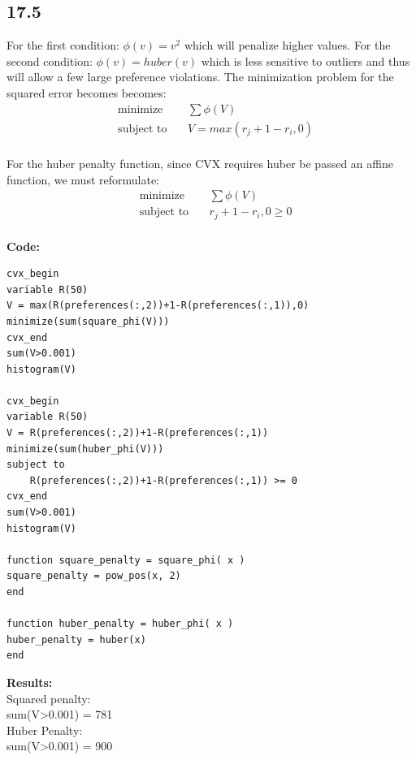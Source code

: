 \documentclass[12pt]{article}
\begin{document}
\subsection*{17.5}
For the first condition: $\phi(v) = v^2$ which will penalize higher values.
For the second condition: $\phi(v) = huber(v)$ which is less sensitive to outliers and thus will allow a few large preference violations.
The minimization problem for the squared error becomes becomes: 
\begin{equation*}
\begin{aligned}
& \underset{}{\text{minimize}}
& & \sum\phi(V)\\
& \text{subject to}\
& & V = max(r_j + 1 - r_i, 0)
\end{aligned}
\end{equation*}\\
For the huber penalty function, since CVX requires huber be passed an affine function, we must reformulate:
\begin{equation*}
\begin{aligned}
& \underset{}{\text{minimize}}
& & \sum\phi(V)\\
& \text{subject to}\
& & r_j + 1 - r_i, 0 \ge 0
\end{aligned}
\end{equation*}\\
\textbf{Code:}\\
\begin{lstlisting}
cvx_begin
variable R(50)
V = max(R(preferences(:,2))+1-R(preferences(:,1)),0)
minimize(sum(square_phi(V)))
cvx_end
sum(V>0.001)
histogram(V)

cvx_begin
variable R(50)
V = R(preferences(:,2))+1-R(preferences(:,1))
minimize(sum(huber_phi(V)))
subject to
    R(preferences(:,2))+1-R(preferences(:,1)) >= 0
cvx_end
sum(V>0.001)
histogram(V)

function square_penalty = square_phi( x )
square_penalty = pow_pos(x, 2)
end

function huber_penalty = huber_phi( x )
huber_penalty = huber(x)
end

\end{lstlisting}
\textbf{Results:}\\
Squared penalty:\\
sum(V>0.001) = 781\\
Huber Penalty:\\
sum(V>0.001) = 900
\end{document}
